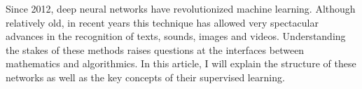 Since 2012, deep neural networks have revolutionized machine learning.
%
Although relatively old, in recent years this technique has allowed very spectacular advances in the recognition of texts, sounds, images and videos.
%
Understanding the stakes of these methods raises questions at the interfaces between mathematics and algorithmics.
%
In this article, I will explain the structure of these networks as well as the key concepts of their supervised learning.